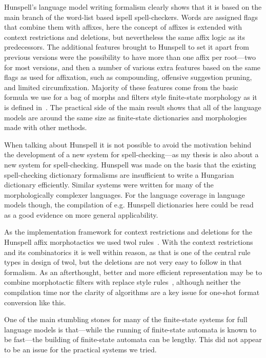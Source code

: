 \documentclass[officiallayout]{unihelcompling}
\begin{document}
Hunspell's language model writing formalism clearly shows that it is based on
the main branch of the word-list based ispell spell-checkers. Words are
assigned flags that combine them with affixes, here the concept of affixes is
extended with context restrictions and deletions, but nevertheless the same
affix logic as its predecessors. The additional features brought to Hunspell to
set it apart from previous versions were the possibility to have more than one
affix per root---two for most versions, and then a number of various extra
features based on the same flags as used for affixation, such as compounding,
offensive suggestion pruning, and limited circumfixation.  Majority of these
features come from the basic formula we use for a bag of morphs and filters
style finite-state morphology as it is defined in~\citet{linden2009hfst}. The
practical side of the main result shows that all of the language models are
around the same size as finite-state dictionaries and morphologies made with
other methods.

When talking about Hunspell it is not possible to avoid the motivation behind
the development of a new system for spell-checking---as my thesis is also about
a new system for spell-checking. Hunspell was made on the basis that the
existing spell-checking dictionary formalisms are insufficient to write a
Hungarian dictionary efficiently. Similar systems were written for many of the
morphologically complexer languages. For the language coverage in language
models though, the compilation of e.g. Hunspell dictionaries here could be
read as a good evidence on more general applicability.

As the implementation framework for context restrictions and deletions for the
Hunspell affix morphotactics we used twol rules~\citep{karttunen1992two}. With
the context restrictions and its combinatorics it is well within reason, as
that is one of the central rule types in design of twol, but the deletions are
not very easy to follow in that formalism. As an afterthought, better and more
efficient representation may be to combine morphotactic filters with replace
style rules~\citep{karttunen1995replace}, although neither the compilation time
nor the clarity of algorithms are a key issue for one-shot format conversion
like this.

One of the main stumbling stones for many of the finite-state systems for full
language models is that---while the running of finite-state automata is known
to be fast---the building of finite-state automata can be lengthy. This did
not appear to be an issue for the practical systems we tried.
\end{document}
